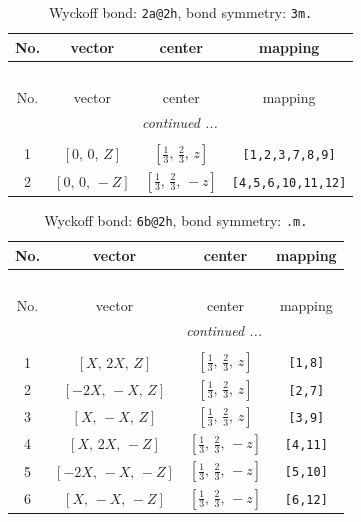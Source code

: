 \documentclass[fleqn,8pt]{jsarticle}
\begin{document}
\begin{longtable}{cccc}
\caption{Wyckoff bond: {\tt 2a@2h}, bond symmetry: {\tt 3m.}}
 \\
 \hline \hline
No. & vector & center & mapping \\ \hline \endfirsthead

\multicolumn{3}{l}{\tablename\ \thetable{}} \\
 \hline \hline
No. & vector & center & mapping \\ \hline \endhead

 \hline \hline
\multicolumn{3}{r}{\footnotesize\it continued ...} \\ \endfoot

 \hline \hline
\multicolumn{3}{r}{} \\ \endlastfoot

1 & $\left[ 0,\, 0,\, Z \right]$ & $\left[ \frac{1}{3},\, \frac{2}{3},\, z \right]$ & {\tt [1,2,3,7,8,9]} \\ \hline
2 & $\left[ 0,\, 0,\, - Z \right]$ & $\left[ \frac{1}{3},\, \frac{2}{3},\, - z \right]$ & {\tt [4,5,6,10,11,12]} \\
\end{longtable}
\renewcommand{\arraystretch}{1.2}
\begin{longtable}{cccc}
\caption{Wyckoff bond: {\tt 6b@2h}, bond symmetry: {\tt .m.}}
 \\
 \hline \hline
No. & vector & center & mapping \\ \hline \endfirsthead

\multicolumn{3}{l}{\tablename\ \thetable{}} \\
 \hline \hline
No. & vector & center & mapping \\ \hline \endhead

 \hline \hline
\multicolumn{3}{r}{\footnotesize\it continued ...} \\ \endfoot

 \hline \hline
\multicolumn{3}{r}{} \\ \endlastfoot

1 & $\left[ X,\, 2 X,\, Z \right]$ & $\left[ \frac{1}{3},\, \frac{2}{3},\, z \right]$ & {\tt [1,8]} \\ \hline
2 & $\left[ - 2 X,\, - X,\, Z \right]$ & $\left[ \frac{1}{3},\, \frac{2}{3},\, z \right]$ & {\tt [2,7]} \\ \hline
3 & $\left[ X,\, - X,\, Z \right]$ & $\left[ \frac{1}{3},\, \frac{2}{3},\, z \right]$ & {\tt [3,9]} \\ \hline
4 & $\left[ X,\, 2 X,\, - Z \right]$ & $\left[ \frac{1}{3},\, \frac{2}{3},\, - z \right]$ & {\tt [4,11]} \\ \hline
5 & $\left[ - 2 X,\, - X,\, - Z \right]$ & $\left[ \frac{1}{3},\, \frac{2}{3},\, - z \right]$ & {\tt [5,10]} \\ \hline
6 & $\left[ X,\, - X,\, - Z \right]$ & $\left[ \frac{1}{3},\, \frac{2}{3},\, - z \right]$ & {\tt [6,12]} \\
\end{longtable}
\end{document}
